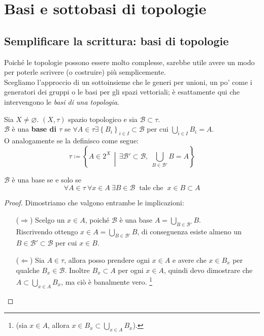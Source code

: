 \newpage
\section{Basi e sottobasi di topologie}
\subsection{\textcolor{TopGener}{\textbf{Semplificare la scrittura: basi di topologie}}}



Poiché le topologie possono essere molto complesse, sarebbe utile avere un modo per poterle scrivere (o costruire) più semplicemente. \\ Scegliamo l'approccio di un sottoinsieme che le generi per unioni, un po' come i generatori dei gruppi o le basi per gli spazi vettoriali; è esattamente qui che intervengono le \textit{basi di una topologia}.

\begin{definition}
	Sia $X \neq \varnothing$. $(X, \tau)$ spazio topologico e sia $\mathcal{B} \subset \tau$. \\ $\mathcal{B}$ è una \textbf{base di $\tau$} se $\forall A \in \tau \exists \left\{B_i\right\}_{i \in I} \subset \mathcal{B}$ per cui $\bigcup_{i \in I} B_i = A$. \\ O analogamente se la definisco come segue:
	\begin{equation*}	
		\tau \coloneqq \left\{A \in 2^X \,\middle|\, \exists \mathcal{B}' \subset \mathcal{B} , \; \bigcup_{B \in \mathcal{B}'} B = A \right\}
	\end{equation*}
\end{definition}

\begin{proposition}
	$\mathcal{B}$ è una base se e solo se 
	\begin{equation*}
	\forall A \in \tau\ \forall x \in A\ \exists B \in \mathcal{B} \ \text{ tale che } \ x \in B \subset A
	\end{equation*}
\end{proposition}
\begin{proof} Dimostriamo che valgono entrambe le implicazioni:
	\begin{enumerate}
		\item[($\Rightarrow$)] Scelgo un $x \in A$, poiché $\mathcal{B}$ è una base $A = \bigcup_{B \in \mathcal{B}'} B$. \\ Riscrivendo ottengo $x \in A = \bigcup_{B \in \mathcal{B}'} B$, di conseguenza esiste almeno un $B \in \mathcal{B}' \subset \mathcal{B}$ per cui $x \in B$.
		\item[($\Leftarrow$)]  Sia $A \in \tau$, allora posso prendere ogni $x \in A$ e avere che $x \in B_x$ per qualche $B_x \in \mathcal{B}$. Inoltre $B_x \subset A$ per ogni $x \in A$, quindi devo dimostrare che $A \subset \bigcup_{x \in A} B_x$, ma ciò è banalmente vero. \footnote{(sia $x \in A$, allora $x \in B_x \subset \bigcup_{x \in A} B_x$).}
	\end{enumerate}
\end{proof}

